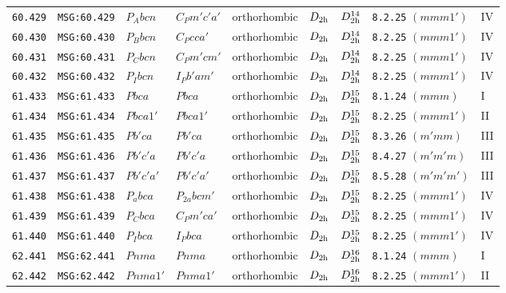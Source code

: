 \documentclass[fleqn,10pt]{jsarticle}
\begin{document}
\begin{center}
\begin{longtable}{lllllllll}
\texttt{60.429} & \texttt{MSG:60.429} & $P_{A}bcn$ & $C_{P}m'c'a'$ & orthorhombic & $D_{\rm 2h}$ & $D_{\rm 2h}^{14}$ & \texttt{8.2.25} $(mmm1')$ & IV \\
\texttt{60.430} & \texttt{MSG:60.430} & $P_{B}bcn$ & $C_{P}cca'$ & orthorhombic & $D_{\rm 2h}$ & $D_{\rm 2h}^{14}$ & \texttt{8.2.25} $(mmm1')$ & IV \\
\texttt{60.431} & \texttt{MSG:60.431} & $P_{C}bcn$ & $C_{P}m'cm'$ & orthorhombic & $D_{\rm 2h}$ & $D_{\rm 2h}^{14}$ & \texttt{8.2.25} $(mmm1')$ & IV \\
\texttt{60.432} & \texttt{MSG:60.432} & $P_{I}bcn$ & $I_{P}b'am'$ & orthorhombic & $D_{\rm 2h}$ & $D_{\rm 2h}^{14}$ & \texttt{8.2.25} $(mmm1')$ & IV \\ \hline
\texttt{61.433} & \texttt{MSG:61.433} & $Pbca$ & $Pbca$ & orthorhombic & $D_{\rm 2h}$ & $D_{\rm 2h}^{15}$ & \texttt{8.1.24} $(mmm)$ & I \\
\texttt{61.434} & \texttt{MSG:61.434} & $Pbca1'$ & $Pbca1'$ & orthorhombic & $D_{\rm 2h}$ & $D_{\rm 2h}^{15}$ & \texttt{8.2.25} $(mmm1')$ & II \\
\texttt{61.435} & \texttt{MSG:61.435} & $Pb'ca$ & $Pb'ca$ & orthorhombic & $D_{\rm 2h}$ & $D_{\rm 2h}^{15}$ & \texttt{8.3.26} $(m'mm)$ & III \\
\texttt{61.436} & \texttt{MSG:61.436} & $Pb'c'a$ & $Pb'c'a$ & orthorhombic & $D_{\rm 2h}$ & $D_{\rm 2h}^{15}$ & \texttt{8.4.27} $(m'm'm)$ & III \\
\texttt{61.437} & \texttt{MSG:61.437} & $Pb'c'a'$ & $Pb'c'a'$ & orthorhombic & $D_{\rm 2h}$ & $D_{\rm 2h}^{15}$ & \texttt{8.5.28} $(m'm'm')$ & III \\
\texttt{61.438} & \texttt{MSG:61.438} & $P_{a}bca$ & $P_{2a}bcm'$ & orthorhombic & $D_{\rm 2h}$ & $D_{\rm 2h}^{15}$ & \texttt{8.2.25} $(mmm1')$ & IV \\
\texttt{61.439} & \texttt{MSG:61.439} & $P_{C}bca$ & $C_{P}m'ca'$ & orthorhombic & $D_{\rm 2h}$ & $D_{\rm 2h}^{15}$ & \texttt{8.2.25} $(mmm1')$ & IV \\
\texttt{61.440} & \texttt{MSG:61.440} & $P_{I}bca$ & $I_{P}bca$ & orthorhombic & $D_{\rm 2h}$ & $D_{\rm 2h}^{15}$ & \texttt{8.2.25} $(mmm1')$ & IV \\ \hline
\texttt{62.441} & \texttt{MSG:62.441} & $Pnma$ & $Pnma$ & orthorhombic & $D_{\rm 2h}$ & $D_{\rm 2h}^{16}$ & \texttt{8.1.24} $(mmm)$ & I \\
\texttt{62.442} & \texttt{MSG:62.442} & $Pnma1'$ & $Pnma1'$ & orthorhombic & $D_{\rm 2h}$ & $D_{\rm 2h}^{16}$ & \texttt{8.2.25} $(mmm1')$ & II \\

\end{longtable}
\end{center}
\end{document}
